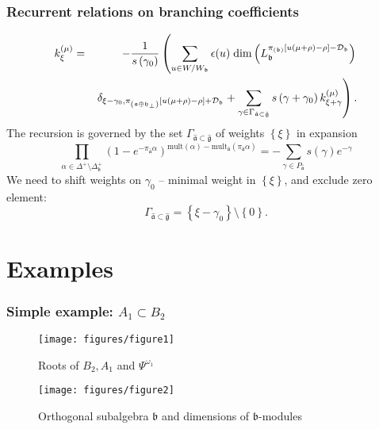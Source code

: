 \documentclass[pdftex]{beamer}
\newcommand{\gfh}{\hat{\mathfrak{g}}}
\newcommand{\afh}{\hat{\mathfrak{a}}}
\theoremstyle{definition} \newtheorem{Def}{Definition}
\begin{document}
\begin{frame}
  \frametitle{Recurrent relations on branching coefficients}
  
\begin{eqnarray*}
k_{\xi }^{\left( \mu \right) } &=&-\frac{1}{s\left( \gamma _{0}\right) }%
\left( \sum_{u\in W/W_{\frak{b}}}\epsilon (u)\;\mathrm{dim}\left( L_{\mathfrak{b}}^{\pi
_{\left( \frak{b}\right) }\left[ u(\mu +\rho )-\rho \right] -\mathcal{D}_{%
\frak{b}}}\right) \right.\\
&&\left.\delta _{\xi -\gamma _{0},\pi _{\left( \frak{a\oplus h}%
_{\perp}\right) }\left[ u(\mu +\rho )-\rho \right] +\mathcal{D}_{\frak{b}%
}}+
\sum_{\gamma \in \Gamma _{\afh\subset \gfh}}s\left( \gamma
+\gamma _{0}\right) k_{\xi +\gamma }^{\left( \mu \right) }\right) \text{.}
\end{eqnarray*}
The recursion is governed by the set $\Gamma _{\afh\subset \gfh}$ of weights $\left\{\xi\right\}$ in expansion
\begin{equation*}
\prod_{\alpha \in \Delta ^{+}\setminus \Delta _{\mathfrak{b} }^{+}}\left( 1-e^{-\pi
_{\afh}\alpha }\right) ^{\mathrm{mult}(\alpha )-\mathrm{mult}_{\afh}(\pi _{\afh}\alpha )}=-\sum_{\gamma \in P_{\afh}}s(\gamma )e^{-\gamma }
\end{equation*}
We need to shift weights on  $\gamma _{0}$ -- minimal weight in  $\left\{ \xi\right\} $, and exclude zero element:
\begin{equation*}
\Gamma _{\afh\subset \gfh}=\left\{ \xi -\gamma
_{0}\right\} \setminus \left\{ 0\right\} .
\end{equation*}
\end{frame}
\section{Examples}
\begin{frame}
  \frametitle{Simple example: $A_{1}\subset B_{2}$}
  \begin{figure}[t]
    \vspace*{-0.5cm}
    \begin{multicols}{2}
      \hfill
      \texttt{[image: figures/figure1]}
      \hfill
      \caption{Roots of $B_{2},A_{1}$ and $\Psi ^{\omega_1  }$}
      \hfill
      \vspace{5mm}
      \texttt{[image: figures/figure2]}
      \caption{Orthogonal subalgebra $\mathfrak{b}$ and dimensions of  $\mathfrak{b}$-modules}
    \end{multicols}
  \end{figure}
\end{frame}
\end{document}
